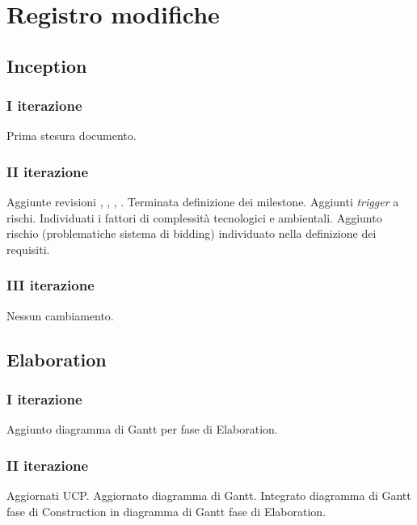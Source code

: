 \documentclass[10pt]{softeng}
\begin{document}
\startofdocument

\clearpage





\clearpage



\clearpage



\clearpage



\clearpage

\section{Registro modifiche}

\subsection{Inception}

\subsubsection{I iterazione}

Prima stesura documento.

\subsubsection{II iterazione}

Aggiunte revisioni , , , .
Terminata definizione dei milestone.
Aggiunti \emph{trigger} a rischi.
Individuati i fattori di complessit\`a tecnologici e ambientali.
Aggiunto rischio  (problematiche sistema di bidding) individuato nella definizione dei requisiti.

\subsubsection{III iterazione}

Nessun cambiamento.

\subsection{Elaboration}

\subsubsection{I iterazione}

Aggiunto diagramma di Gantt per fase di Elaboration.

\subsubsection{II iterazione}

Aggiornati UCP.
Aggiornato diagramma di Gantt.
Integrato diagramma di Gantt fase di Construction in diagramma di Gantt fase di Elaboration.
\end{document}
